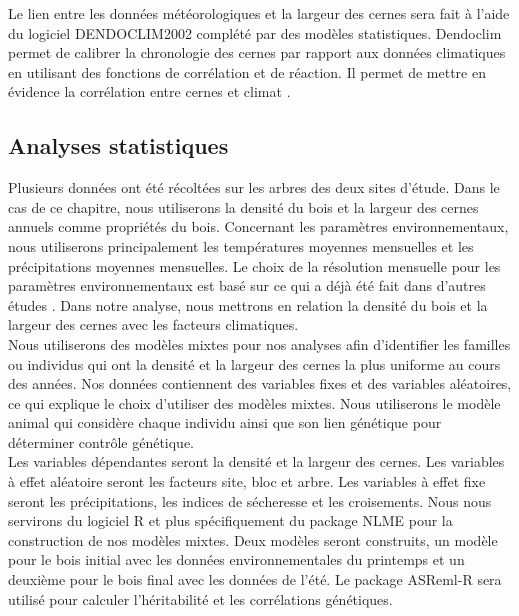\documentclass[a4paper,12pt]{report}
\begin{document}
Le lien entre les données météorologiques et la largeur des cernes sera fait à l'aide du logiciel DENDOCLIM2002 complété par des modèles statistiques. Dendoclim permet de calibrer la chronologie des cernes par rapport aux données climatiques en utilisant des fonctions de corrélation et de réaction. Il permet de mettre en évidence la corrélation entre cernes et climat \citep{Biondi2004}. 

\subsection*{Analyses statistiques}
Plusieurs données ont été récoltées sur les arbres des deux sites d'étude. Dans le cas de ce chapitre, nous utiliserons la densité du bois et la largeur des cernes annuels comme propriétés du bois. Concernant les paramètres environnementaux, nous utiliserons principalement les températures moyennes mensuelles et les précipitations moyennes mensuelles. Le choix de la résolution mensuelle pour les paramètres environnementaux est basé sur ce qui a déjà été fait dans d'autres études \citep{Franceschini2017}. Dans notre analyse, nous mettrons en relation la densité du bois et la largeur des cernes avec les facteurs climatiques. \\

Nous utiliserons des modèles mixtes pour nos analyses afin d'identifier les familles ou individus qui ont la densité et la largeur des cernes la plus uniforme au cours des années. Nos données contiennent des variables fixes et des variables aléatoires, ce qui explique le choix d'utiliser des modèles mixtes. Nous utiliserons le modèle animal qui considère chaque individu ainsi que son lien génétique pour déterminer contrôle génétique. \\ 
Les variables dépendantes seront la densité et la largeur des cernes. Les variables à effet aléatoire seront les facteurs site, bloc et arbre. Les variables à effet fixe seront les précipitations, les indices de sécheresse et les croisements. Nous nous servirons du logiciel R \citep{R2018} et plus spécifiquement du package NLME \citep{NLME2018} pour la construction de nos modèles mixtes. Deux modèles seront construits, un modèle pour le bois initial avec les données environnementales du printemps et un deuxième pour le bois final avec les données de l'été. Le package ASReml-R sera utilisé pour calculer l'héritabilité et les corrélations génétiques. 

\end{document}
